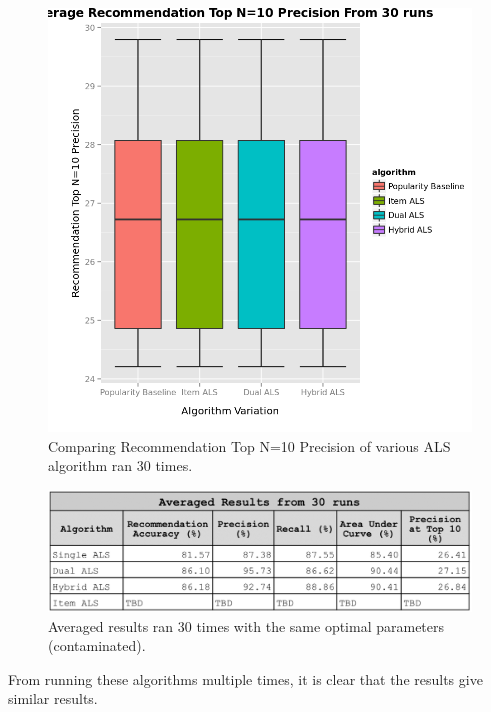 \begin{figure}
\centering
\includegraphics[scale=0.7]{recent_images/top_n.png}
\caption{Comparing Recommendation Top N=10 Precision of various ALS algorithm ran 30 times.}
\label{fig:algorithms}
\end{figure}

\begin{figure}
\centering
\includegraphics[scale=0.4]{images/results_tuning.png}
\caption{Averaged results ran 30 times with the same optimal parameters (contaminated).}
\label{fig:results}
\end{figure}

From running these algorithms multiple times, it is clear that the results give similar results. 

